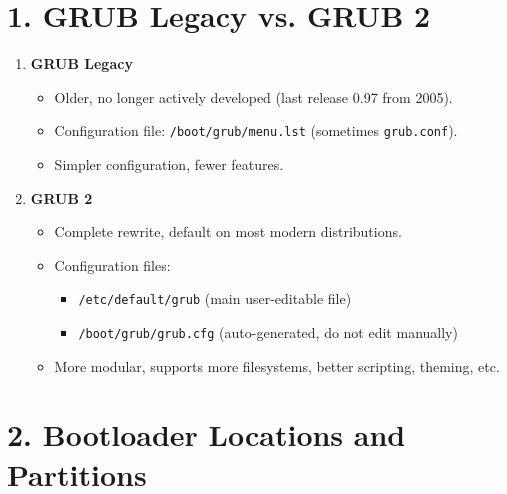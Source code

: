 \documentclass[12pt,a4paper]{report}
\begin{document}
\section*{1. GRUB Legacy vs. GRUB 2}

\begin{enumerate}
    \item \textbf{GRUB Legacy}
    \begin{itemize}
        \item Older, no longer actively developed (last release 0.97 from 2005).
        \item Configuration file: \texttt{/boot/grub/menu.lst} (sometimes \texttt{grub.conf}).
        \item Simpler configuration, fewer features.
    \end{itemize}

    \item \textbf{GRUB 2}
    \begin{itemize}
        \item Complete rewrite, default on most modern distributions.
        \item Configuration files:
        \begin{itemize}
            \item \texttt{/etc/default/grub} (main user-editable file)
            \item \texttt{/boot/grub/grub.cfg} (auto-generated, do not edit manually)
        \end{itemize}
        \item More modular, supports more filesystems, better scripting, theming, etc.
    \end{itemize}
\end{enumerate}

\section*{2. Bootloader Locations and Partitions}
\end{document}
